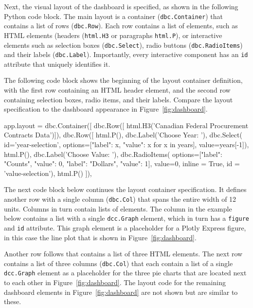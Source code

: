 Next, the visual layout of the dashboard is specified, as shown in the following Python code block. The main layout is a container (\texttt{dbc.Container}) that contains a list of rows (\texttt{dbc.Row}). Each row contains a list of elements, such as HTML elements (headers (\texttt{html.H3} or paragraphs \texttt{html.P}), or interactive elements such as selection boxes (\texttt{dbc.Select}), radio buttons (\texttt{dbc.RadioItems}) and their labels (\texttt{dbc.Label}). Importantly, every interactive component has an \texttt{id} attribute that uniquely identifies it. 

The following code block shows the beginning of the layout container definition, with the first row containing an HTML header element, and the second row containing selection boxes, radio items, and their labels. Compare the layout specification to the dashboard appearance in Figure~\ref{fig:dashboard}.

\begin{pythoncode}
app.layout = dbc.Container([
  dbc.Row([
    html.H3('Canadian Federal Procurement Contracts Data')]),
  dbc.Row([
    html.P(),
    dbc.Label('Choose Year: '),
    dbc.Select(
      id='year-selection',
      options=[{"label": x, "value": x} for x in years],
      value=years[-1]),
    html.P(),
    dbc.Label('Choose Value: '),
    dbc.RadioItems(
      options=[{"label": "Counts", "value": 0},
               {"label": "Dollars", "value": 1}],
      value=0, inline = True,
      id = 'value-selection'),
    html.P() ]),
\end{pythoncode}

The next code block below continues the layout container specification. It defines another row with a single column (\texttt{dbc.Col}) that spans the entire width of 12 units. Columns in turn contain lists of elements. The column in the example below contains a list with a single \texttt{dcc.Graph} element, which in turn has a \texttt{figure} and \texttt{id} attribute. This graph element is a placeholder for a Plotly Express figure, in this case the line plot that is shown in Figure~\ref{fig:dashboard}.

Another row follows that contains a list of three HTML elements. The next row contains a list of three columns (\texttt{dbc.Col}) that each contain a list of a single \texttt{dcc.Graph} element as a placeholder for the three pie charts that are located next to each other in Figure~\ref{fig:dashboard}. The layout code for the remaining dashboard elements in Figure~\ref{fig:dashboard} are not shown but are similar to these.

